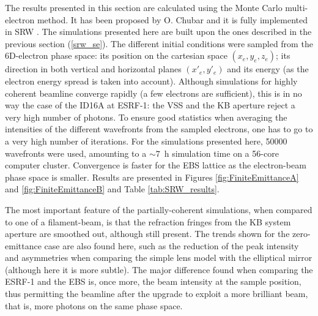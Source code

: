 \documentclass{iucr}              %
\newcommand{\todo}[1]{{\color{red}[TODO: "#1'']}}
\begin{document}
The results presented in this section are calculated using the Monte Carlo multi-electron method. It has been proposed by O. Chubar and it is fully implemented in SRW \cite{Chubar2011b}. The simulations presented here are built upon the ones described in the previous section (\ref{srw_se}). The different initial conditions were sampled from the 6D-electron phase space: its position on the cartesian space $(x_e, y_e, z_e)$; its direction in both vertical and horizontal planes  $(x'_e, y'_e)$ and its energy (as the electron energy spread is taken into account). Although simulations for highly coherent beamline converge rapidly (a few electrons are sufficient), this is in no way the case of the ID16A at ESRF-1: the VSS and the KB aperture reject a very high number of photons. To ensure good statistics when averaging the intensities of the different wavefronts from the sampled electrons, one has to go to a very high number of iterations. For the simulations presented here, 50000 wavefronts were used, amounting to a $\sim7$~h simulation time on a 56-core computer cluster. Convergence is faster for the EBS lattice as the electron-beam phase space is smaller.  Results are presented in Figures \ref{fig:FiniteEmittanceA} and \ref{fig:FiniteEmittanceB} and Table \ref{tab:SRW_results}.

The most important feature of the partially-coherent simulations, when compared to one of a filament-beam, is that the refraction fringes from the KB system aperture are smoothed out, although still present. The trends shown for the zero-emittance case are also found here, such as the reduction of the peak intensity and asymmetries when comparing the simple lens model with the elliptical mirror (although here it is more subtle). The major difference found when comparing the ESRF-1 and the EBS is, once more, the beam intensity at the sample position, thus permitting the beamline after the upgrade to exploit a more brilliant beam, that is, more photons on the same phase space. 



% 
\end{document}
